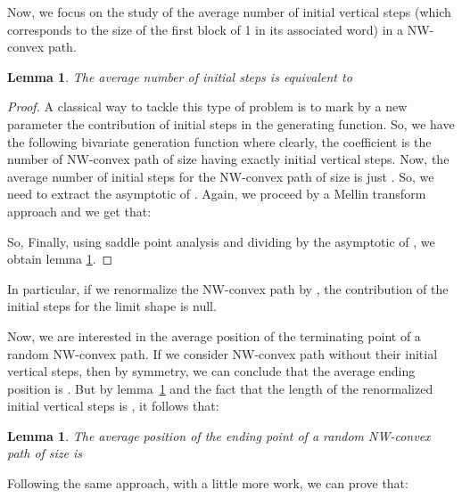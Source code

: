 \documentclass{article}
\newtheorem{lemma}[theorem]{Lemma}
\begin{document}
Now, we focus on the study of the average number of initial vertical steps 
(which corresponds to the size of the first block of 1 in its associated word) in a NW-convex path. 
\begin{lemma}\label{init}
 The average number of initial steps is equivalent to 
\end{lemma}
\begin{proof}
 A classical way to tackle this type of problem is to mark by a new parameter the contribution of initial steps in the generating function. So, we have the following bivariate generation function  where clearly, the coefficient  is the number of NW-convex path of size  having exactly  initial vertical steps. Now, the average number of initial steps for the NW-convex path of size  is just . 
So, we need to extract the asymptotic of . Again, we proceed by a Mellin transform approach and we get that:
 
 So, 
Finally, using saddle point analysis and dividing by the asymptotic of , we obtain lemma \ref{init}.

\end{proof}

In particular, if we renormalize the NW-convex path by , the contribution of the initial steps for the limit shape is null.


Now, we are interested in the average position of the terminating point of a random NW-convex path.
 If we consider NW-convex path without their initial vertical steps, then by symmetry,
 we can conclude that the average ending position is . 
But by lemma~\ref{init} and the fact that the length of the renormalized initial vertical steps is , it follows that:
\begin{lemma}\label{end}
 The average position of the ending point of a random NW-convex path of size  is 
\end{lemma} 

Following the same approach, with a little more work, we can prove that:
\end{document}
